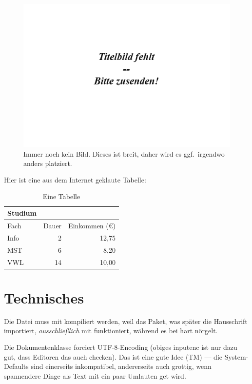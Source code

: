 \documentclass{doku2018}
\begin{document}
\blindtext

\begin{figure}
\begin{center}
\includegraphics[width=.9\textwidth]{Titelbild-fehlt.png}
\caption{Immer noch kein Bild. Dieses ist breit, daher wird es ggf.\ irgendwo
  anders platziert.}
\label{fig:captionssolltenaussagekraeftigsein}
\end{center}
\end{figure}

\blindtext

Hier ist eine aus dem Internet geklaute Tabelle:


\begin{table}
  \begin{center}
    \caption{Eine Tabelle}
  \begin{tabular}{lrr}
    
\toprule
Studium\\  
\midrule 
Fach & Dauer & Einkommen (\euro{})\\ 
\midrule 
Info & 2 & 12,75 \\
MST & 6 & 8,20 \\
VWL & 14 & 10,00\\ 
\bottomrule
  \end{tabular}
  \end{center}
  \end{table}


\section{Technisches}

Die Datei muss mit  kompiliert werden, weil das Paket, was
später die Hausschrift importiert, \emph{ausschließlich} mit 
funktioniert, während es bei  hart nörgelt.

Die Dokumentenklasse forciert UTF-8-Encoding (obiges inputenc ist nur dazu gut,
dass Editoren das auch checken). Das ist eine gute Idee (TM) — die
System-Defaults sind einerseits inkompatibel, andererseits auch grottig, wenn
spannendere Dinge als Text mit ein paar Umlauten get wird.
  
\end{document}
